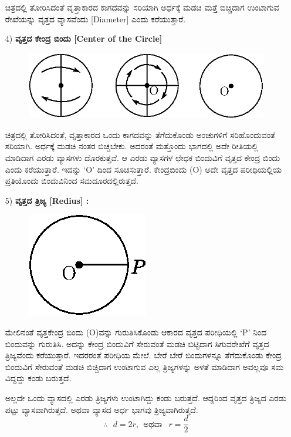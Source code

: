 \begin{enumerate}
 ಚಿತ್ರದಲ್ಲಿ ತೋರಿಸಿದಂತೆ ವೃತ್ತಾಕಾರದ ಕಾಗದವನ್ನು ಸರಿಯಾಗಿ ಅರ್ಧಕ್ಕೆ ಮಡಚಿ ಮತ್ತೆ ಬಿಚ್ಚಿದಾಗ ಉಂಟಾಗುವ ರೇಖೆಯನ್ನು ವೃತ್ತದ ವ್ಯಾಸವೆಂದು [Diameter] ಎಂದು ಕರೆಯುತ್ತಾರೆ. 

\item[4)] \textbf{ವೃತ್ತದ ಕೇಂದ್ರ ಬಿಂದು [Center of the Circle]}
\begin{figure}[H]
\centering
\includegraphics[scale=.98]{src/figure/chap1/fig1-24c.eps}
\end{figure}
 
 ಚಿತ್ರದಲ್ಲಿ ತೋರಿಸಿದಂತೆ, ವೃತ್ತಾಕಾರದ ಒಂದು ಕಾಗದವನ್ನು ತೆಗೆದುಕೊಂಡು ಅಂಚುಗಳಿಗೆ ಸರಿಹೊಂದುವಂತೆ ಸರಿಯಾಗಿ. ಅರ್ಧಕ್ಕೆ ಮಡಚಿ ನಂತರ ಬಿಚ್ಚಬೇಕು. ಅದರಂತೆ ಮತ್ತೊಂದು ಭಾಗದಲ್ಲಿ ಅದೇ ರೀತಿಯಲ್ಲಿ ಮಾಡಿದಾಗ ಎರಡು ವ್ಯಾಸಗಳು ದೊರಕುತ್ತವೆ. ಆ ಎರಡು ವ್ಯಾಸಗಳ ಛೇಧಕ ಬಿಂದುವಿಗೆ ವೃತ್ತದ ಕೇಂದ್ರ ಬಿಂದು ಎಂದು ಕರೆಯುತ್ತಾರೆ. ಇದನ್ನು `O' ದಿಂದ ಸೂಚಿಸುತ್ತಾರೆ. ಕೇಂದ್ರಬಿಂದು (O) ಅದೇ ವೃತ್ತದ ಪರೀಧಿಯಲ್ಲಿಯ ಪ್ರತಿಯೊಂದು ಬಿಂದುವಿನಿಂದ ಸಮದೂರದಲ್ಲಿರುತ್ತದೆ. 
 
\eject
 
\item[5)] \textbf{ವೃತ್ತದ ತ್ರಿಜ್ಯ [Redius] :}
\begin{figure}[H]
\centering
\includegraphics[scale=.98]{src/figure/chap1/fig1-24d.eps}
\end{figure}
	
 
 ಮೇಲಿನಂತೆ ವೃತ್ತಕೇಂದ್ರ ಬಿಂದು (O)ವನ್ನು ಗುರುತಿಸಿಕೊಂಡು ಆಕಾರದ ವೃತ್ತದ ಪರೀಧಿಯಲ್ಲಿ `P' ನಿಂದ ಬಿಂದುವನ್ನು ಗುರುತಿಸಿ. ಅದನ್ನು ಕೇಂದ್ರ ಬಿಂದುವಿಗೆ ಸೇರುವಂತೆ ಮಡಚಿ ಬಿಟ್ಟಿದಾಗ ಸಿಗುವರೇಖೆಗೆ ವೃತ್ತದ ತ್ರಿಜ್ಯವೆಂದು ಕರೆಯುತ್ತಾರೆ. ಇದರರಂತೆ ಪರೀಧಿಯ ಮೇಲೆ.
  ಬೇರೆ ಬೇರೆ ಬಿಂದುಗಳನ್ನೂ ತೆಗೆದುಕೊಂಡು ಕೇಂದ್ರ ಬಿಂದುವಿಗೆ ಸೇರುವಂತೆ ಮಡಚಿ ಬಿಚ್ಚಿದಾಗ ಉಂಟಾಗುವ ಎಲ್ಲ ತ್ರಿಜ್ಯಗಳನ್ನು ಅಳತೆ ಮಾಡಿದಾಗ ಅವಲ್ಲವೂ ಸಮ ವಿದ್ದದ್ದು ಕಂಡು ಬರುತ್ತದೆ. 
  
  ಅಲ್ಲದೇ ಒಂದು ವ್ಯಾಸದಲ್ಲಿ ಎರಡು ತ್ರಿಜ್ಯಗಳು ಉಂಟಾಗಿದ್ದು ಕಂಡು ಬರುತ್ತದೆ. ಆದ್ದರಿಂದ ವೃತ್ತದ ತ್ರಿಜ್ಯದ ಎರಡು ಪಟ್ಟು ವ್ಯಾಸವಾಗಿರುತ್ತದೆ. ಅಥವಾ ವ್ಯಾಸದ ಅರ್ಧ ಭಾಗವು ತ್ರಿಜ್ಯವಾಗಿರುತ್ತದೆ. 
  $$
  \therefore~~~ d = 2 r ,~~ \text{ಅಥವಾ } ~~r = \dfrac{d}{2}
  $$
    \end{enumerate}


